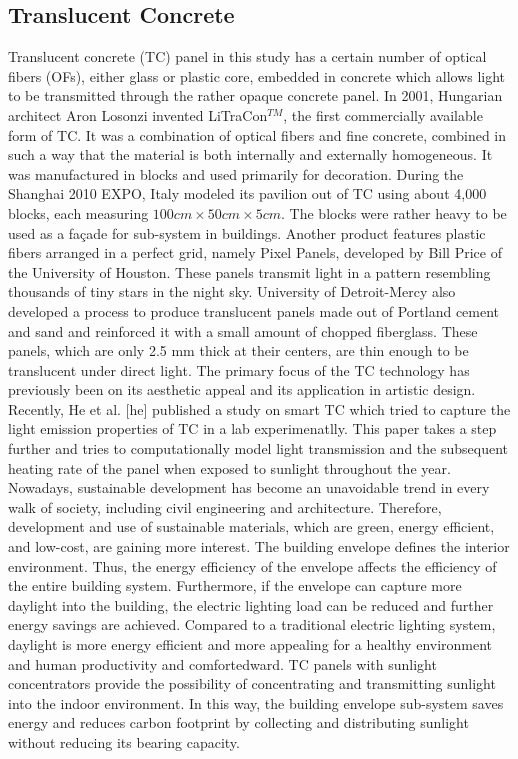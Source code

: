 \documentclass[times, 10pt,a4paper]{article}
\begin{document}
\subsection{Translucent Concrete}
Translucent concrete (TC) panel in this study has a certain number of optical fibers (OFs), either glass or
plastic core, embedded in concrete which allows light to be transmitted through the rather opaque 
concrete panel. In 2001, Hungarian architect Aron Losonzi invented LiTraCon$^{TM}$, the first commercially available form of
TC. It was a combination of optical fibers and fine concrete, combined in such a way that the material is both
internally and externally homogeneous. It was manufactured in blocks and used primarily for decoration.
During the Shanghai 2010 EXPO, Italy modeled its pavilion out of TC using about 4,000 blocks, 
each measuring $100cm\times 50cm\times 5 cm$. The blocks were rather heavy to be used as a fa\c{c}ade for sub-system in buildings. 
Another product features plastic fibers arranged in a perfect grid, namely Pixel Panels, developed by 
Bill Price of the University of Houston. These panels transmit light in a pattern resembling thousands of tiny stars in the night sky. 
University of Detroit-Mercy also developed a process to produce translucent panels made out of Portland cement and sand and reinforced it with a small amount of
chopped fiberglass. These panels, which are only 2.5 mm thick at their centers, are thin enough to be translucent under
direct light. The primary focus of the TC technology has previously been on its aesthetic appeal and its
application in artistic design. Recently, He et al. [he] published a study on smart TC which tried to capture the light emission
properties of TC in a lab experimenatlly. This paper takes a step further and tries to computationally model light transmission
and the subsequent heating rate of the panel when exposed to sunlight throughout the year.\\
%
Nowadays, sustainable development has become an unavoidable trend in every walk of society, including
civil engineering and architecture. Therefore, development and use of sustainable materials, which are green,
energy efficient, and low-cost, are gaining more interest. The building envelope defines the interior
environment. Thus, the energy efficiency of the envelope affects the efficiency of the entire building system.
Furthermore, if the envelope can capture more daylight into the building, the electric lighting load can be
reduced and further energy savings are achieved. Compared to a traditional electric lighting system, daylight is
more energy efficient and more appealing for a healthy environment and human productivity and comfort{edward}.
TC panels with sunlight concentrators provide the possibility of concentrating and transmitting sunlight into
the indoor environment. In this way, the building envelope sub-system saves energy and reduces carbon
footprint by collecting and distributing sunlight without reducing its bearing capacity. 
%
\end{document}
